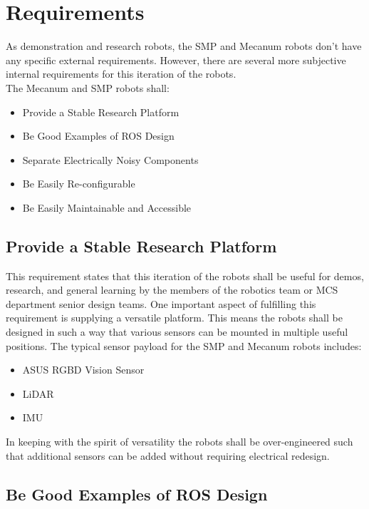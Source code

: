 
\chapter{Requirements}
\label{chap:requirements}

As demonstration and research robots, the SMP and Mecanum robots don't have any specific external requirements. However, there are several more subjective internal requirements for this iteration of the robots.\\

The Mecanum and SMP robots shall:

\begin{itemize}
  \item{Provide a Stable Research Platform}
  \item{Be Good Examples of ROS Design}
  \item{Separate Electrically Noisy Components}
  \item{Be Easily Re-configurable}
  \item{Be Easily Maintainable and Accessible}
\end{itemize}

\section{Provide a Stable Research Platform}

This requirement states that this iteration of the robots shall be useful for demos, research, and general learning by the members of the robotics team or MCS department senior design teams. One important aspect of fulfilling this requirement is supplying a versatile platform. This means the robots shall be designed in such a way that various sensors can be mounted in multiple useful positions.
The typical sensor payload for the SMP and Mecanum robots includes:

\begin{itemize}
  \item{ASUS RGBD Vision Sensor}
  \item{LiDAR}
  \item{IMU}
\end{itemize}

In keeping with the spirit of versatility the robots shall be over-engineered such that additional sensors can be added without requiring electrical redesign.

\section{Be Good Examples of ROS Design}

